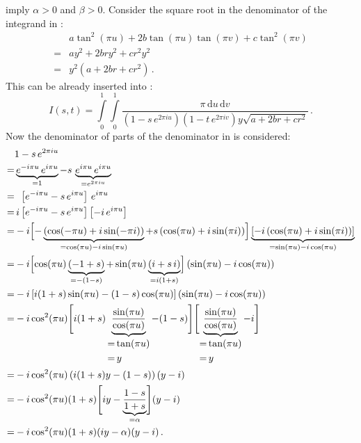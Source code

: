 imply $\alpha>0$ and $\beta>0$.
Consider the square root in the denominator of the integrand in :
\begin{align}
  ~& a \tan^2(\pi u) + 2 b \tan(\pi u) \tan(\pi v) + c \tan^2(\pi v) \nonumber \\
  =& a y^2 + 2 b r y^2 + c r^2 y^2 \nonumber \\
  =& y^2 (a + 2 b r + c r^2) \, .
\end{align}
This can be already inserted into :
\begin{equation}
  I(s,t) = \int\limits_0^1 \int\limits_0^1
       \frac{\pi \,\mathrm{d}u \,\mathrm{d}v}
            {\left(1 - s \, e^{2 \pi i u} \right)
             \left(1 - t \, e^{2 \pi i v} \right)
             y \sqrt{ a + 2 b r + c r^2 } } \, . \label{eqn:int_I_reduced}
\end{equation}
Now the denominator of parts of the denominator in  is considered:
\begin{align}
  ~& 1 - s\, e^{2 \pi i u} \nonumber \\
  =& \underbrace{e^{-i \pi u} \,e^{i \pi u}}_{=1} - s \,\underbrace{e^{i \pi u} \,e^{i \pi u}}_{=e^{2 \pi i u}} \nonumber \\
  =& \, \phantom{i} \left[e^{-i \pi u} - s \,e^{i \pi u} \right]         \,e^{i \pi u} \nonumber \\
  =& \,          i  \left[e^{-i \pi u} - s \,e^{i \pi u} \right] \left[-i\,e^{i \pi u} \right] \nonumber \\
  =& -i \Bigl[ - \underbrace{\left( \cos(-\pi u) + i \sin(- \pi i) \right)}_{= \cos(\pi u) - i \sin(\pi u)}
              + s \left( \cos(\pi u) + i \sin(\pi i) \right) \Bigr]
     \underbrace{\left[-i \left( \cos(\pi u) + i \sin(\pi i) \right) \right]}_{=\sin(\pi u) - i \cos(\pi u)} \nonumber \\
  =& -i \Bigl[ \cos(\pi u) \underbrace{(-1+s)}_{=-(1-s)} + \sin(\pi u) \underbrace{(i+s\,i)}_{=i(1+s)} \Bigr]
     \left( \sin(\pi u) - i \cos(\pi u) \right) \nonumber \\
  =& -i \left[ i(1+s) \sin(\pi u) -(1-s) \cos(\pi u) \right] \left( \sin(\pi u) - i \cos(\pi u) \right) \nonumber \\
  =& -i \cos^2(\pi u)
     \Biggl[ i(1+s) \underbrace{\frac{\sin(\pi u)}{\cos(\pi u)}}_{
     \begin{aligned}
       =& \tan(\pi u) \\
       =& \,y
     \end{aligned}} -(1-s) \Biggr]
     \Biggl[        \underbrace{\frac{\sin(\pi u)}{\cos(\pi u)}}_{
     \begin{aligned}
       =& \tan(\pi u) \\
       =& \,y
     \end{aligned}} - i \Biggr] \nonumber \\
  =& -i \cos^2(\pi u) \left( i(1+s) y - (1-s) \right) (y-i) \nonumber \\
  =& -i \cos^2(\pi u) (1+s) \Biggl[ i y - \underbrace{\frac{1-s}{1+s}}_{= \alpha} \Biggr] (y-i) \nonumber \\
  =& -i \cos^2(\pi u) (1+s) ( i y - \alpha ) (y-i) \, .
\end{align}
